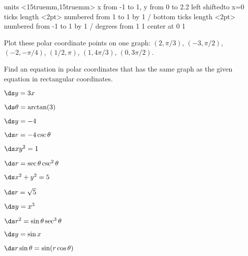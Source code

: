 \figure
\vbox{\beginpicture
\normalgraphs
\ninepoint
\setcoordinatesystem units <15truemm,15truemm>
\setplotarea x from -1 to 1, y from 0 to 2.2
\axis left shiftedto x=0 ticks length <2pt> numbered from 1 to 1 by 1 /
\axis bottom ticks length <2pt> numbered from -1 to 1 by 1 /
 degrees from 1 1 center at 0 1
\endpicture}

\begin{exercises}

\begin{exercise} Plot these polar coordinate points on one graph:
$(2,\pi/3)$, $(-3,\pi/2)$, $(-2,-\pi/4)$, $(1/2,\pi)$, $(1,4\pi/3)$, 
$(0,3\pi/2)$.

\noindent Find an equation in polar coordinates that has the same
graph as the given equation in rectangular coordinates.

\twocol

\begin{exercise} $\ds y=3x$
\begin{answer} $\ds \theta=\arctan(3)$
\end{answer}\end{exercise}

\begin{exercise} $\ds y=-4$
\begin{answer} $\ds r=-4\csc\theta$
\end{answer}\end{exercise}

\begin{exercise} $\ds xy^2=1$
\begin{answer} $\ds r=\sec\theta\csc^2\theta$
\end{answer}\end{exercise}

\begin{exercise} $\ds x^2+y^2=5$
\begin{answer} $\ds r=\sqrt{5}$
\end{answer}\end{exercise}

\begin{exercise} $\ds y=x^3$
\begin{answer} $\ds r^2=\sin\theta\sec^3\theta$
\end{answer}\end{exercise}

\begin{exercise} $\ds y=\sin x$
\begin{answer} $\ds r\sin\theta=\sin(r\cos\theta)$
\end{answer}\end{exercise}


\end{exercise}
\end{exercises}
